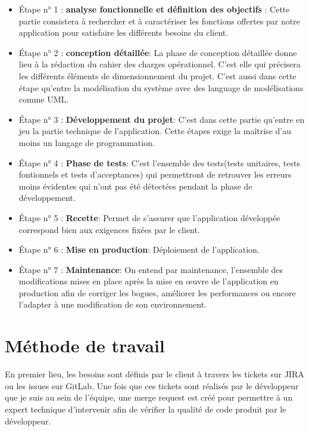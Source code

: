 	\begin{itemize}
		\item Étape n° 1 : \textbf{analyse fonctionnelle et définition des objectifs} : Cette partie consistera à rechercher et à caractériser les fonctions offertes par notre application pour satisfaire les différents besoins du client.\\
		\item Étape n° 2 : \textbf{conception détaillée}: La phase de conception détaillée donne lieu à la rédaction du cahier des charges opérationnel. C'est elle qui précisera les différents éléments de dimensionnement du projet.\cite{planification} C'est aussi dans cette étape qu'entre la modélisation du système avec des language de modélisations comme UML.\\
		\item Étape n° 3 : \textbf{Développement du projet}: C'est dans cette  partie qu'entre en jeu la partie technique de l'application. Cette étapes exige la maîtrise d'au moins un langage de programmation.\\
		\item Étape n° 4 : \textbf{Phase de tests}:
		C'est l'ensemble des tests(tests unitaires, tests fontionnels et tests d'acceptances) qui permettront de retrouver les erreurs moins évidentes qui n'ont pas été détectées pendant la phase de développement.\\
		\item Étape n° 5 : \textbf{Recette}: Permet de s'assurer que l'application développée correspond bien aux exigences fixées par le client.\\
		\item Étape n° 6 : \textbf{Mise en production}: Déploiement de l'application.\\
		\item Étape n° 7 : \textbf{Maintenance}: On entend par maintenance, l'ensemble des modifications mises en place après la mise en œuvre de l'application en production afin de corriger les bogues, améliorer les performances ou encore l'adapter à une modification de son environnement.\cite{planification}
	\end{itemize}

	\section{Méthode de travail}
		En premier lieu, les besoins sont définis par le client à travers les tickets sur JIRA ou les issues sur GitLab. Une fois que ces tickets sont réalisés par le développeur que je suis au sein de l'équipe, une merge request est créé pour permettre à un expert technique d'intervenir afin de vérifier la qualité de code produit par le développeur.\\
		
